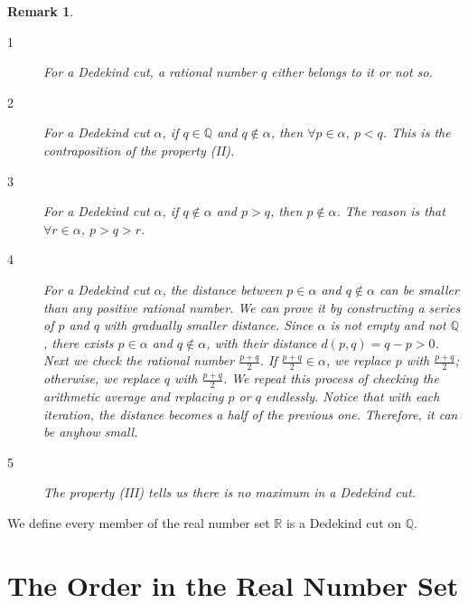 \documentclass[onecolumn]{article}
\newtheorem{remark}{Remark}[section]
\begin{document}
\begin{remark}
  \begin{description}
    \item[{1}] For a Dedekind cut, a rational number $q$ either belongs to it or 
    not so.
    \item[{2}] For a Dedekind cut $\alpha$, if $q \in \mathbb{Q}$ and 
    $q \notin \alpha$, then $\forall p \in \alpha$, $p < q$. This is the 
    contraposition of the property (II).
    \item[{3}] For a Dedekind cut $\alpha$, if $q \notin \alpha$ and $p > q$, 
    then $p \notin \alpha$. The reason is that $\forall r \in \alpha$, 
    $p > q > r$.
    \item[{4}] For a Dedekind cut $\alpha$, the distance between $p \in \alpha$ 
    and $q \notin \alpha$ can be smaller than any positive rational number. We 
    can prove it by constructing a series of $p$ and $q$ with gradually smaller 
    distance. Since $\alpha$ is not empty and not $\mathbb{Q}$, there exists 
    $p \in \alpha$ and $q \notin \alpha$, with their distance 
    $d(p, q) = q - p > 0$. Next we check the rational number $\frac{p + q}{2}$. 
    If $\frac{p + q}{2} \in \alpha$, we replace $p$ with $\frac{p + q}{2}$; 
    otherwise, we replace $q$ with $\frac{p + q}{2}$. We repeat this process of 
    checking the arithmetic average and replacing $p$ or $q$ endlessly. Notice 
    that with each iteration, the distance becomes a half of the previous one. 
    Therefore, it can be anyhow small.
    \item[{5}] The property (III) tells us there is no maximum in a Dedekind 
    cut.
  \end{description}
\end{remark}

We define every member of the real number set $\mathbb{R}$ is a Dedekind cut on 
$\mathbb{Q}$.

\section{The Order in the Real Number Set}
\end{document}
